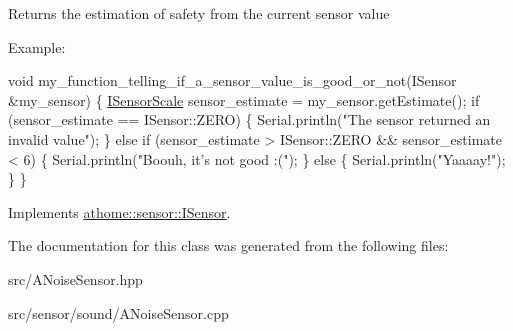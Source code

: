 Returns the estimation of safety from the current sensor value

Example\+:


\begin{DoxyCode}
\textcolor{keywordtype}{void} my\_function\_telling\_if\_a\_sensor\_value\_is\_good\_or\_not(ISensor &my\_sensor) \{
  \mbox{\hyperlink{classathome_1_1sensor_1_1_i_sensor_aa70bc27a4c17c86caf96cca776541ddf}{ISensorScale}} sensor\_estimate = my\_sensor.getEstimate();
  \textcolor{keywordflow}{if} (sensor\_estimate == ISensor::ZERO) \{
    Serial.println(\textcolor{stringliteral}{"The sensor returned an invalid value"});
  \}
  \textcolor{keywordflow}{else} \textcolor{keywordflow}{if} (sensor\_estimate > ISensor::ZERO && sensor\_estimate < 6) \{
    Serial.println(\textcolor{stringliteral}{"Boouh, it's not good :("});
  \}
  \textcolor{keywordflow}{else} \{
    Serial.println(\textcolor{stringliteral}{"Yaaaay!"});
  \}
\}
\end{DoxyCode}
 

Implements \mbox{\hyperlink{classathome_1_1sensor_1_1_i_sensor_af86df8538fecfcfc670b4adfbbde6abb}{athome\+::sensor\+::\+I\+Sensor}}.



The documentation for this class was generated from the following files\+:\begin{DoxyCompactItemize}
\item 
src/A\+Noise\+Sensor.\+hpp\item 
src/sensor/sound/A\+Noise\+Sensor.\+cpp\end{DoxyCompactItemize}
